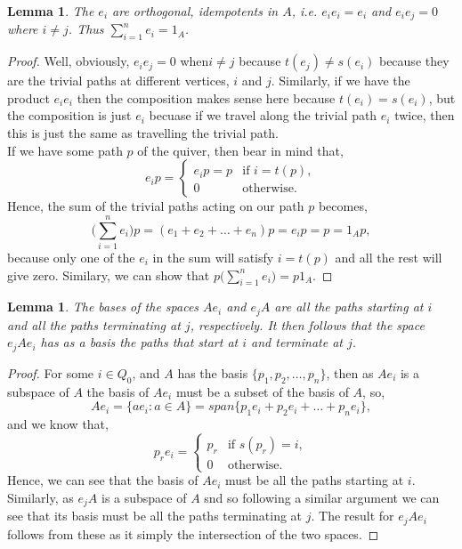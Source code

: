 \documentclass[11.5pt, twoside, a4paper, titlepage]{report}
\providecommand{\equ}[0]{\begin{equation*}}
\providecommand{\eequ}[0] {\end{equation*}}
\theoremstyle{definition}
\theoremstyle{plain}
\newtheorem{lem}[mydef]{Lemma}
\begin{document}
\begin{lem} 
The $e_i$ are orthogonal, idempotents in $A$, i.e. $e_ie_i=e_i$ and $e_ie_j=0$ where $i\neq j$. Thus $\sum_{i=1}^{n}{e_i}=1_{A}$.
\end{lem}
\begin{proof}
Well, obviously, $e_ie_j=0$ when$i\neq j$ because $t(e_j)\neq s(e_i)$ because they are the trivial paths at different vertices, $i$ and $j$. Similarly, if we have the product $e_ie_i$ then the composition makes sense here because $t(e_i)=s(e_i)$, but the composition is just $e_i$ becuase if we travel along the trivial path $e_i$ twice, then this is just the same as travelling the trivial path. \\
If we have some path $p$ of the quiver, then bear in mind that,
\equ
e_ip=
\begin{cases}
e_ip=p & \text{if } i=t(p),\\
0 & \text{otherwise.}
\end{cases}
\eequ
Hence, the sum of the trivial paths acting on our path $p$ becomes, 
\equ
\big(\sum^{n}_{i=1}{e_i}\big)p=(e_1+e_2+\dots +e_n)p=e_ip=p=1_Ap,
\eequ
because only one of the $e_i$ in the sum will satisfy $i=t(p)$ and all the rest will give zero. Similary, we can show that $p\big(\sum^{n}_{i=1}{e_i}\big)=p1_A$.
\end{proof}

\begin{lem} \label{idempotentspaceslem}
The bases of the spaces $Ae_i$ and $e_jA$ are all the paths starting at $i$ and all the paths terminating at $j$, respectively. It then follows that the space $e_jAe_i$ has as a basis the paths that start at $i$ and terminate at $j$.
\end{lem}
\begin{proof}
For some $i\in Q_0$, and $A$ has the basis $\{p_1, p_2, \dots, p_n\}$, then as $Ae_i$ is a subspace of $A$ the basis of $Ae_i$ must be a subset of the basis of $A$, so, 
\equ
Ae_i=\{ae_i:a\in A\}=span\{p_1e_i+p_2e_i+\dots+p_ne_i\},
\eequ
and we know that,
\equ
p_re_i=
\begin{cases}
p_r & \text{if } s(p_r)=i,\\
0 & \text{otherwise}.
\end{cases}
\eequ
Hence, we can see that the basis of $Ae_i$ must be all the paths starting at $i$. Similarly, as $e_jA$ is a subspace of $A$ snd so following a similar argument we can see that its basis must be all the paths terminating at $j$. The result for $e_jAe_i$ follows from these as it simply the intersection of the two spaces.
\end{proof}
\end{document}
